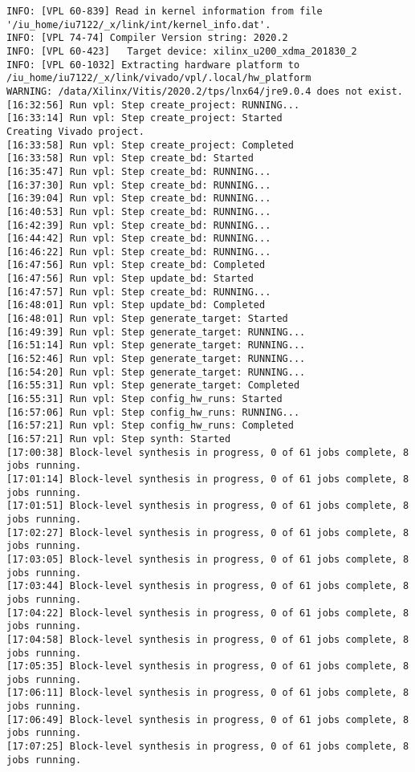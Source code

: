 \begin{lstlisting}[label=some-code-2,caption=Содержимое файла v++\_vinc.log]
INFO: [VPL 60-839] Read in kernel information from file '/iu_home/iu7122/_x/link/int/kernel_info.dat'.
INFO: [VPL 74-74] Compiler Version string: 2020.2
INFO: [VPL 60-423]   Target device: xilinx_u200_xdma_201830_2
INFO: [VPL 60-1032] Extracting hardware platform to /iu_home/iu7122/_x/link/vivado/vpl/.local/hw_platform
WARNING: /data/Xilinx/Vitis/2020.2/tps/lnx64/jre9.0.4 does not exist.
[16:32:56] Run vpl: Step create_project: RUNNING...
[16:33:14] Run vpl: Step create_project: Started
Creating Vivado project.
[16:33:58] Run vpl: Step create_project: Completed
[16:33:58] Run vpl: Step create_bd: Started
[16:35:47] Run vpl: Step create_bd: RUNNING...
[16:37:30] Run vpl: Step create_bd: RUNNING...
[16:39:04] Run vpl: Step create_bd: RUNNING...
[16:40:53] Run vpl: Step create_bd: RUNNING...
[16:42:39] Run vpl: Step create_bd: RUNNING...
[16:44:42] Run vpl: Step create_bd: RUNNING...
[16:46:22] Run vpl: Step create_bd: RUNNING...
[16:47:56] Run vpl: Step create_bd: Completed
[16:47:56] Run vpl: Step update_bd: Started
[16:47:57] Run vpl: Step create_bd: RUNNING...
[16:48:01] Run vpl: Step update_bd: Completed
[16:48:01] Run vpl: Step generate_target: Started
[16:49:39] Run vpl: Step generate_target: RUNNING...
[16:51:14] Run vpl: Step generate_target: RUNNING...
[16:52:46] Run vpl: Step generate_target: RUNNING...
[16:54:20] Run vpl: Step generate_target: RUNNING...
[16:55:31] Run vpl: Step generate_target: Completed
[16:55:31] Run vpl: Step config_hw_runs: Started
[16:57:06] Run vpl: Step config_hw_runs: RUNNING...
[16:57:21] Run vpl: Step config_hw_runs: Completed
[16:57:21] Run vpl: Step synth: Started
[17:00:38] Block-level synthesis in progress, 0 of 61 jobs complete, 8 jobs running.
[17:01:14] Block-level synthesis in progress, 0 of 61 jobs complete, 8 jobs running.
[17:01:51] Block-level synthesis in progress, 0 of 61 jobs complete, 8 jobs running.
[17:02:27] Block-level synthesis in progress, 0 of 61 jobs complete, 8 jobs running.
[17:03:05] Block-level synthesis in progress, 0 of 61 jobs complete, 8 jobs running.
[17:03:44] Block-level synthesis in progress, 0 of 61 jobs complete, 8 jobs running.
[17:04:22] Block-level synthesis in progress, 0 of 61 jobs complete, 8 jobs running.
[17:04:58] Block-level synthesis in progress, 0 of 61 jobs complete, 8 jobs running.
[17:05:35] Block-level synthesis in progress, 0 of 61 jobs complete, 8 jobs running.
[17:06:11] Block-level synthesis in progress, 0 of 61 jobs complete, 8 jobs running.
[17:06:49] Block-level synthesis in progress, 0 of 61 jobs complete, 8 jobs running.
[17:07:25] Block-level synthesis in progress, 0 of 61 jobs complete, 8 jobs running.

\end{lstlisting}
